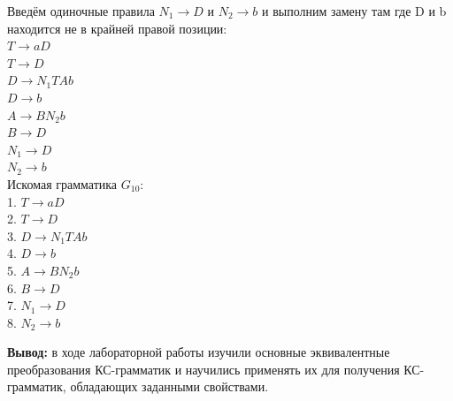 \documentclass[a4paper,14pt]{extarticle}
\begin{document}
\begin{enumerate}[1.]
Введём одиночные правила $N_1 \rightarrow D$ и $N_2 \rightarrow b$ и выполним замену там где D и b находится не в крайней правой позиции:\\
$T \rightarrow aD$\\
$T \rightarrow D$\\
$D \rightarrow N_1TAb$\\
$D \rightarrow b$\\
$A \rightarrow BN_2b$\\
$B \rightarrow D$\\
$N_1 \rightarrow D$\\
$N_2 \rightarrow b$\\

Искомая грамматика $G_{10}$:\\
1. $T \rightarrow aD$\\
2. $T \rightarrow D$\\
3. $D \rightarrow N_1TAb$\\
4. $D \rightarrow b$\\
5. $A \rightarrow BN_2b$\\
6. $B \rightarrow D$\\
7. $N_1 \rightarrow D$\\
8. $N_2 \rightarrow b$\\

\end{enumerate}

\textbf{Вывод: } в ходе лабораторной работы изучили основные эквивалентные преобразования
КС-грамматик и научились применять их для получения
КС-грамматик, обладающих заданными свойствами.
\end{document}
